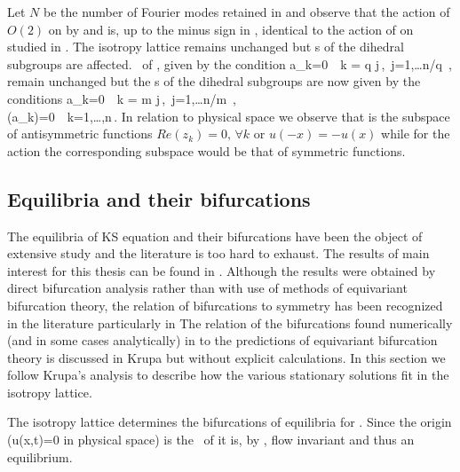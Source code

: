 Let $N$ be the number of Fourier modes retained in 
and observe that the action of $O(2)$ 
on  by  and  is,
up to the minus sign in , identical
to the action  of  on  studied
in . 
The isotropy lattice remains unchanged but \fixedsp s of the dihedral subgroups are affected. 
\Fixedsp\ of , given by the condition
\beq
	a_k=0\ \ k = q j\,,\ j=1,\ldots\lfloor n/q \rfloor\,,
	\label{eq:O2CqFix}
\eeq
remain unchanged but the \fixedsp s of the dihedral subgroups  are now given by the conditions
\bea
	a_k=0\ \ k = m j\,,\ j=1,\ldots\lfloor n/m \rfloor\,, \\
	\Re(a_k)=0\ \ k=1,\ldots,n\,.
	\label{eq:O2ksDqFix}
\eea
In relation to physical space we observe that  is the subspace of antisymmetric functions $Re(z_k)=0,\, \forall k$ or $u(-x)=-u(x)$ while for the action  the corresponding
subspace would be that of symmetric functions.

\subsection{Equilibria and their bifurcations}

The equilibria of KS equation and their bifurcations have been the object of extensive study
and the literature is too hard to exhaust. The results of main interest for this thesis
can be found in . 
Although the results were obtained by direct bifurcation analysis rather than with use of methods of equivariant bifurcation theory, the relation of bifurcations
to  symmetry has been recognized in the literature particularly in  
The relation of the bifurcations found numerically (and in some cases analytically) in \cite{KNSks90} 
to the predictions of equivariant bifurcation theory is discussed in Krupa\cite{Krupa_bifurcations_1990}
but without explicit calculations. In this section we follow Krupa's analysis to describe how the various
stationary solutions fit in the isotropy lattice.

The isotropy lattice determines the bifurcations of equilibria for \KS. Since the origin (u(x,t)=0 in 
physical space) is the \fixedsp\ of  it is, by , flow invariant and thus 
an equilibrium. 




